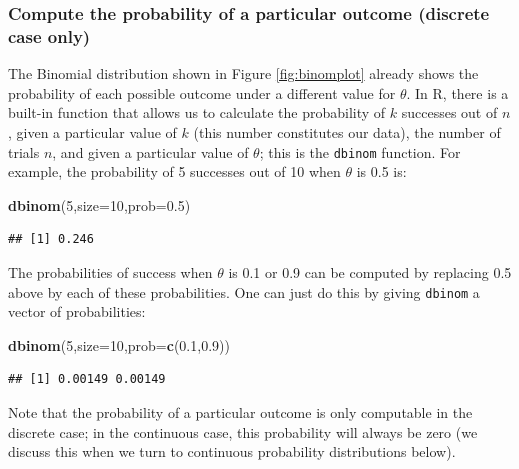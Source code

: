 \documentclass[12pt,]{krantz}
\newenvironment{Shaded}{\begin{snugshade}}{\end{snugshade}}
\newcommand{\KeywordTok}[1]{\textcolor[rgb]{0.13,0.29,0.53}{\textbf{#1}}}
\newcommand{\DataTypeTok}[1]{\textcolor[rgb]{0.13,0.29,0.53}{#1}}
\newcommand{\DecValTok}[1]{\textcolor[rgb]{0.00,0.00,0.81}{#1}}
\newcommand{\FloatTok}[1]{\textcolor[rgb]{0.00,0.00,0.81}{#1}}
\newcommand{\NormalTok}[1]{#1}
\theoremstyle{definition}
\theoremstyle{definition}
\theoremstyle{definition}
\theoremstyle{remark}
\begin{document}
\subsubsection{Compute the probability of a particular outcome (discrete
case
only)}\label{compute-the-probability-of-a-particular-outcome-discrete-case-only}

The Binomial distribution shown in Figure \ref{fig:binomplot} already
shows the probability of each possible outcome under a different value
for \(\theta\). In R, there is a built-in function that allows us to
calculate the probability of \(k\) successes out of \(n\), given a
particular value of \(k\) (this number constitutes our data), the number
of trials \(n\), and given a particular value of \(\theta\); this is the
\texttt{dbinom} function. For example, the probability of 5 successes
out of 10 when \(\theta\) is 0.5 is:

\begin{Shaded}
\begin{Highlighting}[]
\KeywordTok{dbinom}\NormalTok{(}\DecValTok{5}\NormalTok{,}\DataTypeTok{size=}\DecValTok{10}\NormalTok{,}\DataTypeTok{prob=}\FloatTok{0.5}\NormalTok{)}
\end{Highlighting}
\end{Shaded}

\begin{verbatim}
## [1] 0.246
\end{verbatim}

The probabilities of success when \(\theta\) is 0.1 or 0.9 can be
computed by replacing 0.5 above by each of these probabilities. One can
just do this by giving \texttt{dbinom} a vector of probabilities:

\begin{Shaded}
\begin{Highlighting}[]
\KeywordTok{dbinom}\NormalTok{(}\DecValTok{5}\NormalTok{,}\DataTypeTok{size=}\DecValTok{10}\NormalTok{,}\DataTypeTok{prob=}\KeywordTok{c}\NormalTok{(}\FloatTok{0.1}\NormalTok{,}\FloatTok{0.9}\NormalTok{))}
\end{Highlighting}
\end{Shaded}

\begin{verbatim}
## [1] 0.00149 0.00149
\end{verbatim}

Note that the probability of a particular outcome is only computable in
the discrete case; in the continuous case, this probability will always
be zero (we discuss this when we turn to continuous probability
distributions below).
\end{document}
